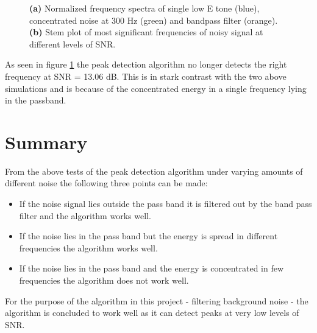\begin{figure}[H]
\begin{subfigure}{0.49\textwidth}
\caption{}
\label{fig:concentrated_stem}
\end{subfigure}
\caption{\textbf{(a)} Normalized frequency spectra of single low E tone (blue), concentrated noise at 300 Hz (green) and bandpass filter (orange). \textbf{(b)} Stem plot of most significant frequencies of noisy signal at different levels of SNR.}
\label{fig:concentrated_noise}
\end{figure}

As seen in figure \ref{fig:concentrated_stem} the peak detection algorithm no longer detects the right frequency at SNR = 13.06 dB. This is in stark contrast with the two above simulations and is because of the concentrated energy in a single frequency lying in the passband.

\section{Summary}
From the above tests of the peak detection algorithm under varying amounts of different noise the following three points can be made:
\begin{itemize}
\item If the noise signal lies outside the pass band it is filtered out by the band pass filter and the algorithm works well.
\item If the noise lies in the pass band but the energy is spread in different frequencies the algorithm works well.
\item If the noise lies in the pass band and the energy is concentrated in few frequencies the algorithm does not work well.
\end{itemize}
For the purpose of the algorithm in this project - filtering background noise - the algorithm is concluded to work well as it can detect peaks at very low levels of SNR.